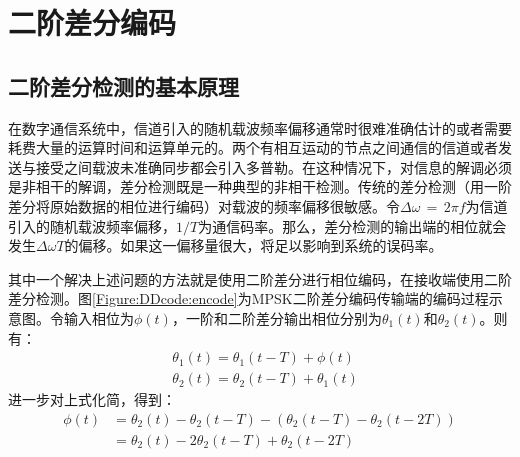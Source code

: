 \chapter{二阶差分编码}
\section{二阶差分检测的基本原理}
	在数字通信系统中，信道引入的随机载波频率偏移通常时很难准确估计的或者需要耗费大量的运算时间和运算单元的。两个有相互运动的节点之间通信的信道或者发送与接受之间载波未准确同步都会引入多普勒。在这种情况下，对信息的解调必须是非相干的解调，差分检测既是一种典型的非相干检测。传统的差分检测（用一阶差分将原始数据的相位进行编码）对载波的频率偏移很敏感。令$\Delta\omega\,=\,2\pi f $为信道引入的随机载波频率偏移，$1/T$为通信码率。那么，差分检测的输出端的相位就会发生$\Delta\omega T $的偏移。如果这一偏移量很大，将足以影响到系统的误码率。
	
	其中一个解决上述问题的方法就是使用二阶差分进行相位编码，在接收端使用二阶差分检测。图\ref{Figure:DDcode:encode}为MPSK二阶差分编码传输端的编码过程示意图。令输入相位为$\phi(t)$，一阶和二阶差分输出相位分别为$\theta_1(t)$和$\theta_2(t)$。则有：
	\begin{equation}
	\begin{split}
	&\theta_1(t)=\theta_1(t-T)+\phi(t) \\
	&\theta_2(t)=\theta_2(t-T)+\theta_1(t)
	\end{split}
	\end{equation}
	进一步对上式化简，得到：
	\begin{equation}
	\begin{split}
		\phi(t) &=\theta_2(t)-\theta_2(t-T)-\left( \theta_2(t-T) - \theta_2(t-2T) \right) \\
		        &=\theta_2(t)-2\theta_2(t-T)+\theta_2(t-2T)
	\end{split}	
	\end{equation}
	
